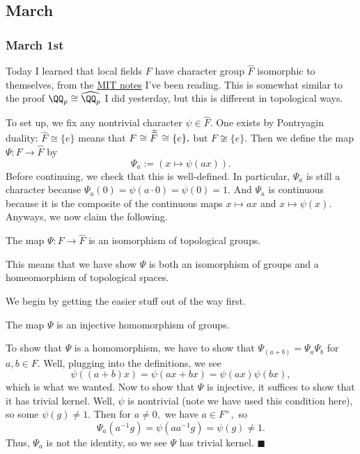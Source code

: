\subsection{March}

\subsubsection{March 1st}
Today I learned that local fields $F$ have character group $\widehat F$ isomorphic to themselves, from the \href{http://math.mit.edu/~poonen/786/notes.pdf}{MIT notes} I've been reading. This is somewhat similar to the proof $\QQ_p\cong\widehat{\QQ_p}$ I did yesterday, but this is different in topological ways.

To set up, we fix any nontrivial character $\psi\in\widehat F.$ One exists by Pontryagin duality: $\widehat{F}\cong\{e\}$ means that $F\cong\widehat{\smash{\widehat F}\vphantom{1^]}\,}\cong\{e\},$ but $F\not\cong\{e\}.$ Then we define the map $\Psi:F\to\widehat F$ by
\[\Psi_a:=(x\mapsto\psi(ax)).\]
Before continuing, we check that this is well-defined. In particular, $\Psi_a$ is still a character because $\Psi_a(0)=\psi(a\cdot0)=\psi(0)=1.$ And $\Psi_a$ is continuous because it is the composite of the continuous maps $x\mapsto ax$ and $x\mapsto\psi(x).$ Anyways, we now claim the following.
\begin{theorem}
    The map $\Psi:F\to\widehat F$ is an isomorphism of topological groups. 
\end{theorem}
This means that we have show $\Psi$ is both an isomorphism of groups and a homeomorphism of topological spaces.

We begin by getting the easier stuff out of the way first.
\begin{lemma}
    The map $\Psi$ is an injective homomorphism of groups.
\end{lemma}
To show that $\Psi$ is a homomorphism, we have to show that $\Psi_{(a+b)}=\Psi_a\Psi_b$ for $a,b\in F.$ Well, plugging into the definitions, we see
\[\psi((a+b)x)=\psi(ax+bx)=\psi(ax)\psi(bx),\]
which is what we wanted. Now to show that $\Psi$ is injective, it suffices to show that it has trivial kernel. Well, $\psi$ is nontrivial (note we have used this condition here), so some $\psi(g)\ne1.$ Then for $a\ne0,$ we have $a\in F^\times,$ so
\[\Psi_a\left(a^{-1}g\right)=\psi\left(aa^{-1}g\right)=\psi(g)\ne1.\]
Thus, $\Psi_a$ is not the identity, so we see $\Psi$ has trivial kernel. $\blacksquare$

